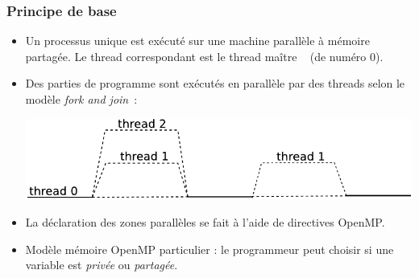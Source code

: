 \documentclass{beamer}
\begin{document}
\begin{frame}
  \frametitle{Principe de base}
\begin{itemize}
  
\item Un processus unique est exécuté sur une machine parallèle à mémoire
  partagée. Le thread correspondant est le thread \og maître \fg~ (de numéro 0).
  
\item Des parties de programme sont exécutés en parallèle par des threads selon
  le modèle {\it fork and join}~:

  \smallskip
  \begin{center}
    \includegraphics[width=0.9\linewidth]{fork_and_join}
  \end{center}
  \bigskip
  
\item La déclaration des zones parallèles se fait à l'aide de
  directives OpenMP.

\item Modèle mémoire OpenMP particulier : le programmeur peut choisir si une
  variable est {\it privée} ou {\it partagée}.
\end{itemize}

\end{frame}
\end{document}
